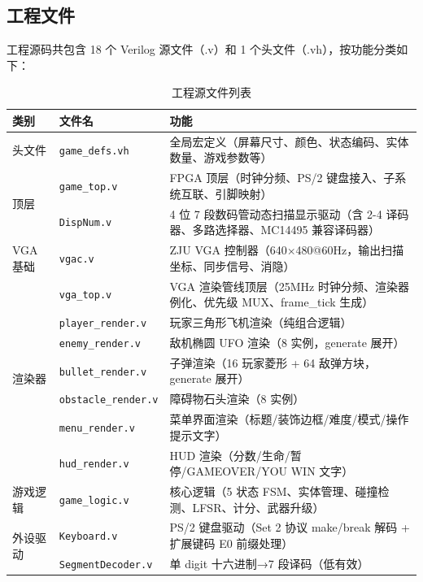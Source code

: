 \documentclass[12pt,a4paper]{ctexart}
\begin{document}
\subsection{工程文件}

工程源码共包含 18 个 Verilog 源文件（.v）和 1 个头文件（.vh），按功能分类如下：

\begin{table}[H]
\centering
\caption{工程源文件列表}
\label{tab:files}
\begin{tabular}{llp{5.5cm}}
\toprule
\textbf{类别} & \textbf{文件名} & \textbf{功能} \\
\midrule
头文件 & \texttt{game\_defs.vh} & 全局宏定义（屏幕尺寸、颜色、状态编码、实体数量、游戏参数等） \\
\midrule
\multirow{2}{*}{顶层} & \texttt{game\_top.v} & FPGA 顶层（时钟分频、PS/2 键盘接入、子系统互联、引脚映射） \\
                       & \texttt{DispNum.v} & 4 位 7 段数码管动态扫描显示驱动（含 2-4 译码器、多路选择器、MC14495 兼容译码器） \\
\midrule
VGA 基础 & \texttt{vgac.v} & ZJU VGA 控制器（640$\times$480@60Hz，输出扫描坐标、同步信号、消隐） \\
          & \texttt{vga\_top.v} & VGA 渲染管线顶层（25MHz 时钟分频、渲染器例化、优先级 MUX、frame\_tick 生成） \\
\midrule
\multirow{5}{*}{渲染器} & \texttt{player\_render.v} & 玩家三角形飞机渲染（纯组合逻辑） \\
                        & \texttt{enemy\_render.v} & 敌机椭圆 UFO 渲染（8 实例，generate 展开） \\
                        & \texttt{bullet\_render.v} & 子弹渲染（16 玩家菱形 + 64 敌弹方块，generate 展开） \\
                        & \texttt{obstacle\_render.v} & 障碍物石头渲染（8 实例） \\
                        & \texttt{menu\_render.v} & 菜单界面渲染（标题/装饰边框/难度/模式/操作提示文字） \\
                        & \texttt{hud\_render.v} & HUD 渲染（分数/生命/暂停/GAMEOVER/YOU WIN 文字） \\
\midrule
游戏逻辑 & \texttt{game\_logic.v} & 核心逻辑（5 状态 FSM、实体管理、碰撞检测、LFSR、计分、武器升级） \\
\midrule
\multirow{5}{*}{外设驱动} & \texttt{Keyboard.v} & PS/2 键盘驱动（Set 2 协议 make/break 解码 + 扩展键码 E0 前缀处理） \\
                        & \texttt{SegmentDecoder.v} & 单 digit 十六进制→7 段译码（低有效） \\

\end{tabular}
\end{table}
\end{document}
